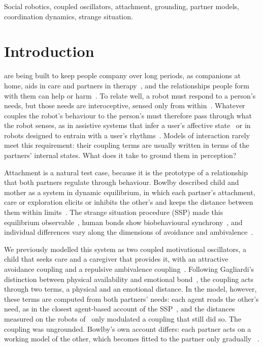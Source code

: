 \documentclass[journal]{IEEEtran}
\newif\ifdraftmarkers
\newcommand{\authornote}[1]{\ifdraftmarkers\textcolor{blue}{\textit{[Authors: #1]}}\fi}
\begin{document}
\begin{IEEEkeywords}
Social robotics, coupled oscillators, attachment, grounding, partner models, coordination dynamics, strange situation.
\end{IEEEkeywords}

\section{Introduction}
\label{sec:intro}

 are being built to keep people company over long periods, as companions at home, aids in care and partners in therapy~\cite{Prescott2021,Collins2013}, and the relationships people form with them can help or harm~\cite{Prescott2021,Sharkey2010}. To relate well, a robot must respond to a person's needs, but those needs are interoceptive, sensed only from within~\cite{Craig2002}. Whatever couples the robot's behaviour to the person's must therefore pass through what the robot senses, as in assistive systems that infer a user's affective state~\cite{Robillard2018} or in robots designed to entrain with a user's rhythms~\cite{Lomas2022resonance}. Models of interaction rarely meet this requirement: their coupling terms are usually written in terms of the partners' internal states. What does it take to ground them in perception?

Attachment is a natural test case, because it is the prototype of a relationship that both partners regulate through behaviour. Bowlby described child and mother as a system in dynamic equilibrium, in which each partner's attachment, care or exploration elicits or inhibits the other's and keeps the distance between them within limits~\cite{Bowlby1982}. The strange situation procedure (SSP) made this equilibrium observable~\cite{Ainsworth1978,Prince2021,Chow2018representing}, human bonds show biobehavioural synchrony~\cite{Feldman2017}, and individual differences vary along the dimensions of avoidance and ambivalence~\cite{Fraley2003infant,Gagliardi2021our}.

We previously modelled this system as two coupled motivational oscillators, a child that seeks care and a caregiver that provides it, with an attractive avoidance coupling and a repulsive ambivalence coupling~\cite{Htet2024,Dixit2019dynamics}. Following Gagliardi's distinction between physical availability and emotional bond~\cite{Gagliardi2022}, the coupling acts through two terms, a physical and an emotional distance. In the model, however, these terms are computed from both partners' needs: each agent reads the other's need, as in the closest agent-based account of the SSP~\cite{Gagliardi2022}, and the distances measured on the robots of~\cite{Htet2024} only modulated a coupling that still did so. The coupling was ungrounded. Bowlby's own account differs: each partner acts on a working model of the other, which becomes fitted to the partner only gradually~\cite{Bowlby1982} \authornote{page numbers in the 1982 edition}.
\end{document}
